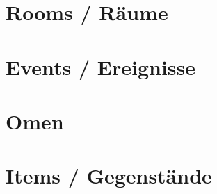 \documentclass[10pt,a4paper,oneside,ngerman]{article}
\begin{document}
\tableofcontents



\pagebreak

\section{Rooms / Räume}



\twocolumn
\section{Events / Ereignisse}



\pagebreak
\pagebreak

\twocolumn
\section{Omen}



\pagebreak

\section{Items / Gegenstände}


\end{document}

